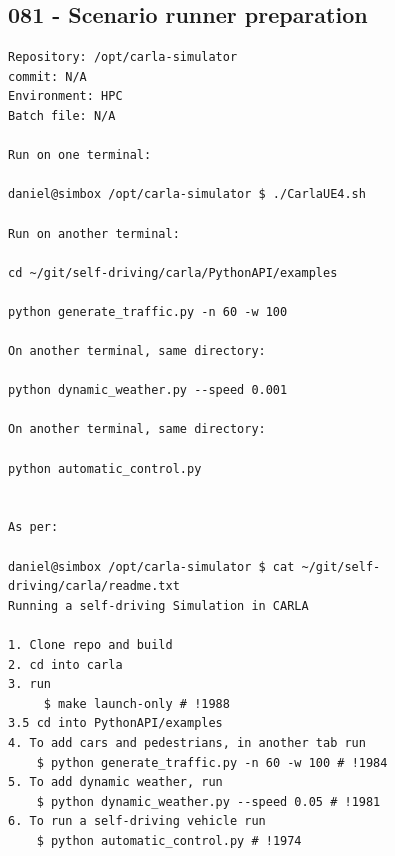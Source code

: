 \subsection{081 - Scenario runner preparation}
\label{app_res:081}
\begin{verbatim}
Repository: /opt/carla-simulator
commit: N/A
Environment: HPC 
Batch file: N/A

Run on one terminal:

daniel@simbox /opt/carla-simulator $ ./CarlaUE4.sh 

Run on another terminal:

cd ~/git/self-driving/carla/PythonAPI/examples

python generate_traffic.py -n 60 -w 100

On another terminal, same directory:

python dynamic_weather.py --speed 0.001

On another terminal, same directory:

python automatic_control.py


As per:

daniel@simbox /opt/carla-simulator $ cat ~/git/self-driving/carla/readme.txt 
Running a self-driving Simulation in CARLA

1. Clone repo and build
2. cd into carla
3. run 
	 $ make launch-only # !1988
3.5 cd into PythonAPI/examples
4. To add cars and pedestrians, in another tab run
	$ python generate_traffic.py -n 60 -w 100 # !1984
5. To add dynamic weather, run
	$ python dynamic_weather.py --speed 0.05 # !1981
6. To run a self-driving vehicle run
	$ python automatic_control.py # !1974


\end{verbatim}

